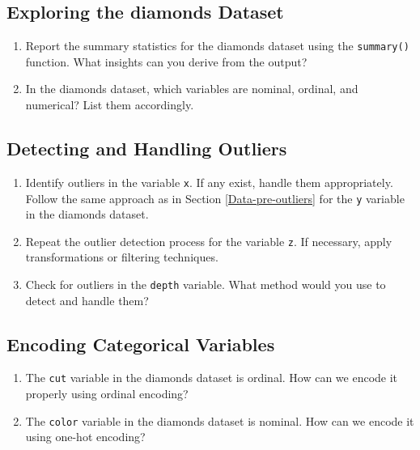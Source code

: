 \documentclass[
  11pt,
]{book}
\providecommand{\tightlist}{%
  \setlength{\itemsep}{0pt}\setlength{\parskip}{0pt}}
\theoremstyle{definition}
\theoremstyle{definition}
\theoremstyle{definition}
\theoremstyle{definition}
\theoremstyle{remark}
\begin{document}
\subsection*{Exploring the diamonds Dataset}\label{exploring-the-diamonds-dataset}


\begin{enumerate}
\def\labelenumi{\arabic{enumi}.}
\setcounter{enumi}{2}
\tightlist
\item
  Report the summary statistics for the diamonds dataset using the \texttt{summary()} function. What insights can you derive from the output?\\
\item
  In the diamonds dataset, which variables are nominal, ordinal, and numerical? List them accordingly.
\end{enumerate}

\subsection*{Detecting and Handling Outliers}\label{detecting-and-handling-outliers}


\begin{enumerate}
\def\labelenumi{\arabic{enumi}.}
\setcounter{enumi}{4}
\tightlist
\item
  Identify outliers in the variable \texttt{x}. If any exist, handle them appropriately. Follow the same approach as in Section \ref{Data-pre-outliers} for the \texttt{y} variable in the diamonds dataset.\\
\item
  Repeat the outlier detection process for the variable \texttt{z}. If necessary, apply transformations or filtering techniques.\\
\item
  Check for outliers in the \texttt{depth} variable. What method would you use to detect and handle them?
\end{enumerate}

\subsection*{Encoding Categorical Variables}\label{encoding-categorical-variables-1}


\begin{enumerate}
\def\labelenumi{\arabic{enumi}.}
\setcounter{enumi}{7}
\tightlist
\item
  The \texttt{cut} variable in the diamonds dataset is ordinal. How can we encode it properly using ordinal encoding?\\
\item
  The \texttt{color} variable in the diamonds dataset is nominal. How can we encode it using one-hot encoding?
\end{enumerate}
\end{document}
